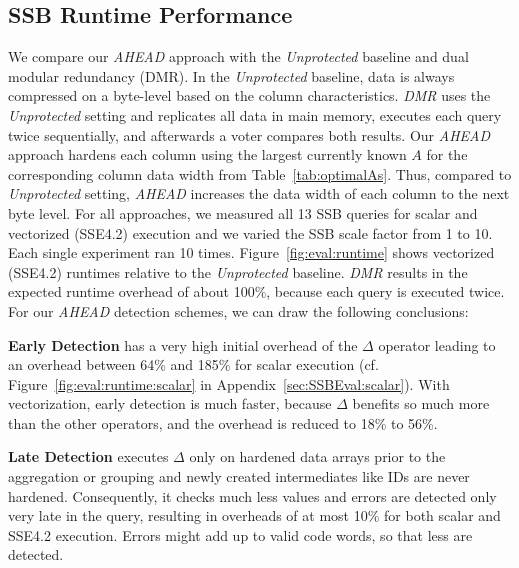 \subsection{SSB Runtime Performance}
We compare our \emph{AHEAD} approach with the \emph{Unprotected} baseline and dual modular redundancy (DMR). In the \emph{Unprotected} baseline, data is always compressed on a byte-level based on the column characteristics. \emph{DMR} uses the \emph{Unprotected} setting and replicates all data in main memory, executes each query twice sequentially, and afterwards a voter compares both results. Our \emph{AHEAD} approach hardens each column using the largest currently known \(A\) for the corresponding column data width from Table~\ref{tab:optimalAs}. Thus, compared to \emph{Unprotected} setting, \emph{AHEAD} increases the data width of each column to the next byte level. For all approaches, we measured all 13 SSB queries for scalar and vectorized (SSE4.2) execution and we varied the SSB scale factor from 1 to 10. Each single experiment ran 10 times. Figure~\ref{fig:eval:runtime} shows vectorized (SSE4.2) runtimes relative to the \emph{Unprotected} baseline. \emph{DMR} results in the expected runtime overhead of about 100\%, because each query is executed twice. For our \emph{AHEAD} detection schemes, we can draw the following conclusions:


\textbf{Early Detection} has a very high initial overhead of the \(\Delta\) operator leading to an overhead between 64\% and 185\% for scalar execution (cf. Figure~\ref{fig:eval:runtime:scalar} in Appendix~\ref{sec:SSBEval:scalar}). With vectorization, early detection is much faster, because \(\Delta\) benefits so much more than the other operators, and the overhead is reduced to 18\% to 56\%.

\textbf{Late Detection} executes \(\Delta\) only on hardened data arrays prior to the aggregation or grouping and newly created intermediates like IDs are never hardened. Consequently, it checks much less values and errors are detected only very late in the query, resulting in overheads of at most 10\% for both scalar and SSE4.2 execution. Errors might add up to valid code words, so that less are detected. %


